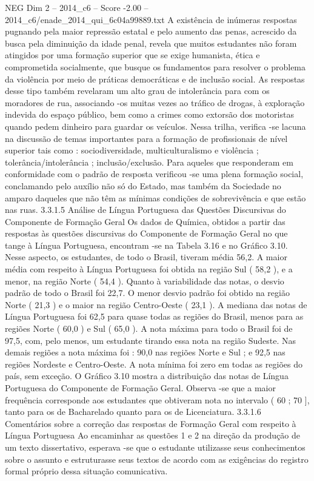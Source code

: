\begin{textsample}{NEG Dim 2 – 2014\_c6 – Score -2.00 – 2014\_c6/enade\_2014\_qui\_6c04a99889.txt}
A existência de inúmeras respostas pugnando pela maior repressão estatal e pelo aumento das penas, acrescido da busca pela diminuição da idade penal, revela que muitos estudantes não foram atingidos por uma formação superior que se exige humanista, ética e comprometida socialmente, que busque os fundamentos para resolver o problema da violência por meio de práticas democráticas e de inclusão social.
As respostas desse tipo também revelaram um alto grau de intolerância para com os moradores de rua, associando -os muitas vezes ao tráfico de drogas, à exploração indevida do espaço público, bem como a crimes como extorsão dos motoristas quando pedem dinheiro para guardar os veículos.
Nessa trilha, verifica -se lacuna na discussão de temas importantes para a formação de profissionais de nível superior tais como : sociodiversidade, multiculturalismo e violência ; tolerância/intolerância ; inclusão/exclusão.
Para aqueles que responderam em conformidade com o padrão de resposta verificou -se uma plena formação social, conclamando pelo auxílio não só do Estado, mas também da Sociedade no amparo daqueles que não têm as mínimas condições de sobrevivência e que estão nas ruas. 3.3.1.5 Análise de Língua Portuguesa das Questões Discursivas do Componente de Formação Geral Os dados de Química, obtidos a partir das respostas às questões discursivas do Componente de Formação Geral no que tange à Língua Portuguesa, encontram -se na Tabela 3.16 e no Gráfico 3.10.
Nesse aspecto, os estudantes, de todo o Brasil, tiveram média 56,2.
A maior média com respeito à Língua Portuguesa foi obtida na região Sul ( 58,2 ), e a menor, na região Norte ( 54,4 ).
Quanto à variabilidade das notas, o desvio padrão de todo o Brasil foi 22,7.
O menor desvio padrão foi obtido na região Norte ( 21,3 ) e o maior na região Centro-Oeste ( 23,1 ).
A mediana das notas de Língua Portuguesa foi 62,5 para quase todas as regiões do Brasil, menos para as regiões Norte ( 60,0 ) e Sul ( 65,0 ).
A nota máxima para todo o Brasil foi de 97,5, com, pelo menos, um estudante tirando essa nota na região Sudeste.
Nas demais regiões a nota máxima foi : 90,0 nas regiões Norte e Sul ; e 92,5 nas regiões Nordeste e Centro-Oeste.
A nota mínima foi zero em todas as regiões do país, sem exceção.
O Gráfico 3.10 mostra a distribuição das notas de Língua Portuguesa do Componente de Formação Geral.
Observa -se que a maior frequência corresponde aos estudantes que obtiveram nota no intervalo ( 60 ; 70 ], tanto para os de Bacharelado quanto para os de Licenciatura. 3.3.1.6 Comentários sobre a correção das respostas de Formação Geral com respeito à Língua Portuguesa Ao encaminhar as questões 1 e 2 na direção da produção de um texto dissertativo, esperava -se que o estudante utilizasse seus conhecimentos sobre o assunto e estruturasse seus textos de acordo com as exigências do registro formal próprio dessa situação comunicativa.

\end{textsample}
